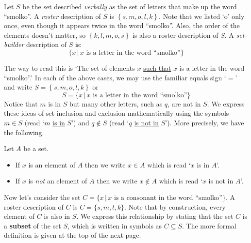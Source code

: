 Let $S$ be the set described \textit{verbally} as the set of letters that make up the word ``smolko''.  A  \emph{roster} description of $S$ is $\left\{ s, m, o, l, k \right\}$. Note that we listed `o' only once, even though it appears twice in the word ``smolko''.  Also, the order of the elements doesn't matter, so $\left\{ k,  l,  m, o, s \right\}$ is also a roster description of $S$.  A \emph{set-builder} description of $S$ is:
$$\{ x \, | \, \mbox{$x$ is a letter in the word ``smolko''}\}$$

The way to read this is `The set of elements $x$ \underline{such that} $x$ is a letter in the word ``smolko''.'   In each of the above cases, we may use the familiar equals sign `$=$' and write  $S = \left\{ s, m, o, l, k \right\}$ or
$$S = \{ x \, | \, \mbox{$x$ is a letter in the word ``smolko''}\}$$
Notice that  $m$ is in $S$ but many other letters, such as $q$, are not in $S$.  We express these ideas of set inclusion and exclusion mathematically using the symbols $m \in S$ (read `$m$ \underline{is in} $S$') and $q \notin S$ (read `$q$ \underline{is not in} $S$').  More precisely, we have the following.

\begin{tcolorbox}
\begin{defn} \label{notationforsetinclusion}  Let $A$ be a set.

\begin{itemize}

\item If $x$ is an element of $A$ then we write $x \in A$\index{$\in$} which is read `$x$ is in $A$'.

\item If $x$ is \emph{not} an element of $A$ then we write $x \notin A$\index{$\notin$} which is read `$x$ is not in $A$'.

\end{itemize}

\end{defn}
\end{tcolorbox}

Now let's consider the set $C =  \{ x \, | \, \mbox{$x$ is a consonant in the word ``smolko''}\}$.  A roster description of $C$ is  $C = \{ s, m, l, k\}$.  Note that by construction, every element of $C$ is also in $S$.  We express this relationship by stating that the set $C$ is a \textbf{subset} of the set $S$, which is written in symbols as $C \subseteq S$.  The more formal definition is given at the top of the next page.

